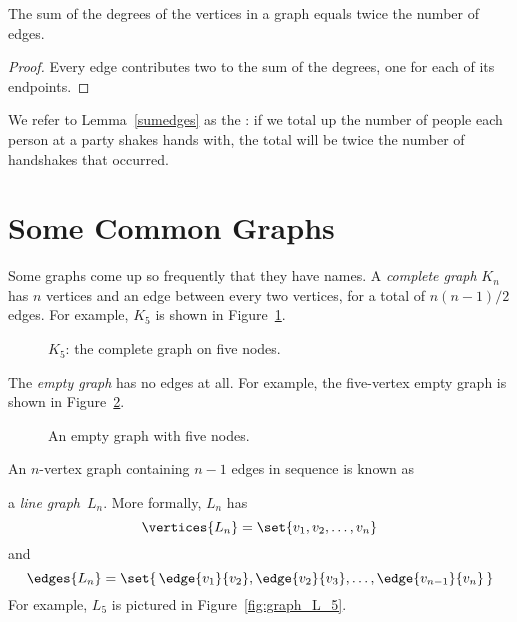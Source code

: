 \begin{lemma}\label{sumedges}
The sum of the degrees of the vertices in a graph equals twice the
number of edges.
\end{lemma}

\begin{proof}
Every edge contributes two to the sum of the degrees, one for each of its endpoints.
\end{proof}

We refer to Lemma~\ref{sumedges} as the : if
we total up the number of people each person at a party shakes hands
with, the total will be twice the number of handshakes that occurred.

\begin{problems}

\practiceproblems

\classproblems
{}

\examproblems
{}
\end{problems}

\section{Some Common Graphs}\label{sec:common_graphs}

Some graphs come up so frequently that they have names.  A
\emph{complete graph}%
$K_n$ has $n$ vertices and an edge between
every two vertices, for a total of $n(n-1)/2$ edges.  For example,
$K_5$ is shown in Figure~\ref{fig:K_5}.

\begin{figure}
\caption{$K_5$: the complete graph on five nodes.}
\label{fig:K_5}
\end{figure}

The \emph{empty graph}  has no edges
at all.  For example, the five-vertex empty graph is shown in
Figure~\ref{fig:graph_empty_5}.

\begin{figure}
\caption{An empty graph with five nodes.}
\label{fig:graph_empty_5}
\end{figure}

An $n$-vertex graph containing $n - 1$ edges in sequence is known as

a \emph{line graph}~$L_n$.  More formally, $L_n$ has
\begin{equation*}
    \vertices{L_n} = \set{ v_1, v_2, \dots, v_n }
\end{equation*}
and
\begin{equation*}
    \edges{L_n} = \set{\, \edge{v_1}{v_2}, \edge{v_2}{v_3}, \dots,
    \edge{v_{n-1}}{v_n} \, }
\end{equation*}
For example, $L_5$ is pictured in Figure~\ref{fig:graph_L_5}.

